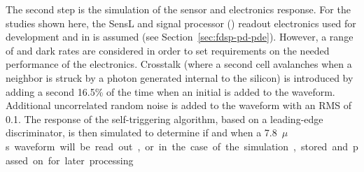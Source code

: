 

The second step is the simulation of the sensor and electronics response. For the studies shown here, the SensL  and  signal processor () readout electronics used for  development and in  is assumed (see Section~\ref{sec:fdsp-pd-pde}). However, a range of  and dark rates are considered in order to set requirements on the needed performance of the electronics.
Crosstalk (where a second cell avalanches when a neighbor is struck by a photon generated internal to the silicon) is introduced by adding a second \phel \num{16.5}\% of the time when an initial \phel is added to the waveform. Additional uncorrelated random noise is added to the waveform with an RMS of %
\SI{0.1}{\phel{}}. The response of the  self-triggering algorithm, based on a leading-edge discriminator, is then simulated to determine if and when a \SI{7.8}{$\mu$s} waveform will be read out, or in the case of the simulation, %
stored and passed on for later processing.


